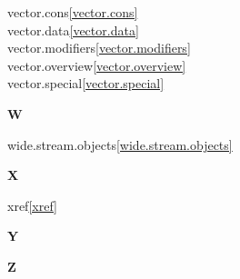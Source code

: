 \begin{multicols}{2}
vector.cons\quad\ref{vector.cons}\\
vector.data\quad\ref{vector.data}\\
vector.modifiers\quad\ref{vector.modifiers}\\
vector.overview\quad\ref{vector.overview}\\
vector.special\quad\ref{vector.special}\\
\par \textbf{W}\par
wide.stream.objects\quad\ref{wide.stream.objects}\\
\par \textbf{X}\par
xref\quad\ref{xref}\\
\par \textbf{Y}\par
\par \textbf{Z}\par
\end{multicols}

